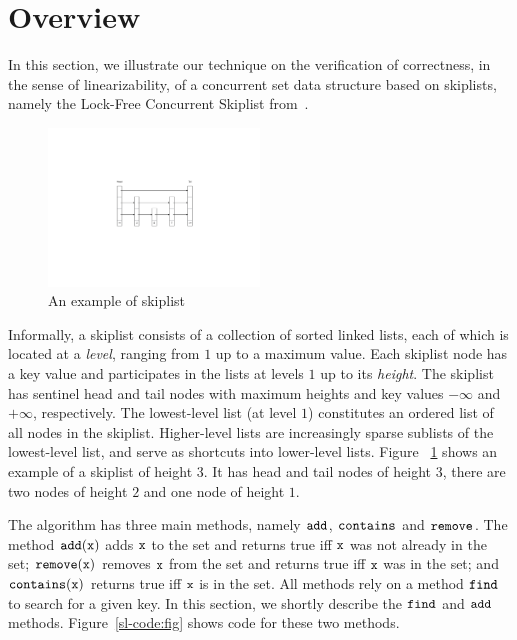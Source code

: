 \section{Overview}
\label{sec:overview}

In this section, we illustrate our technique on the verification of 
correctness, in the sense of linearizability, of
a concurrent set data structure based on skiplists, namely the
Lock-Free Concurrent Skiplist from~\cite[Section 14.4]{ArtOfMpP}.
\begin{figure} 
\vspace{-20pt}
  \begin{center}
 \includegraphics[width=0.5\textwidth, trim={11cm 10cm 10cm 9cm}, clip]{normalskipshape.pdf}  
    \caption{An example of skiplist}
    \label{normalskiplist}
  \end{center}
  \vspace{-35pt}
  \vspace{1pt}
\end{figure}
Informally, a skiplist consists of a collection of sorted linked lists, each of which is located at a {\em level}, ranging from $1$ up to a maximum value. Each skiplist node has a key value and participates in the lists at levels $1$ up to its {\em height}.
The skiplist has sentinel head and tail nodes with maximum heights and key values $-\infty$ and $+\infty$, respectively.
The lowest-level list (at level $1$) constitutes an ordered list of all nodes
in the skiplist. Higher-level lists are increasingly sparse sublists of the
lowest-level list, and serve as shortcuts into lower-level lists. Figure ~\ref{normalskiplist} shows an example of a skiplist of height 3. It has head and tail nodes of height $3$, there are two nodes of height $2$ and one node of height $1$.

The algorithm has three main methods, namely $\tt add$, $\tt contains$ and $\tt remove$. The method $\tt add(x)$ adds $\tt x$ to the set and returns true iff $\tt x$ was not already in the set; $\tt remove(x)$ removes $\tt x$ from the set and returns true iff ${\tt x}$ was in the set; and $\tt contains(x)$
returns true iff $\tt x$ is in the set.
All methods rely on a method $\tt find$ to search for a given key. 
In this section, we shortly describe the $\tt find$ and $\tt add$ methods.
Figure~\ref{sl-code:fig} shows code for these two methods.



